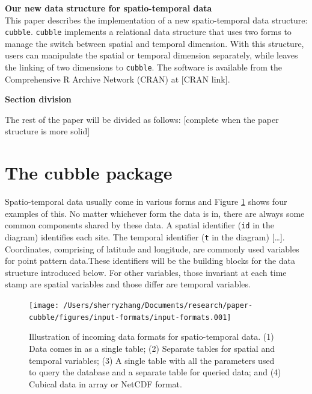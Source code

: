 \documentclass[
]{jss}
\begin{document}
\textbf{Our new data structure for spatio-temporal data}\\
This paper describes the implementation of a new spatio-temporal data
structure: \texttt{cubble}. \texttt{cubble} implements a relational data
structure that uses two forms to manage the switch between spatial and
temporal dimension. With this structure, users can manipulate the
spatial or temporal dimension separately, while leaves the linking of
two dimensions to \texttt{cubble}. The software is available from the
Comprehensive R Archive Network (CRAN) at {[}CRAN link{]}. \newline

\textbf{Section division}

The rest of the paper will be divided as follows: {[}complete when the
paper structure is more solid{]}

\newpage

\hypertarget{the-cubble-package}{%
\section{The cubble package}\label{the-cubble-package}}

Spatio-temporal data usually come in various forms and Figure
\ref{fig:cubble-diagram} shows four examples of this. No matter
whichever form the data is in, there are always some common components
shared by these data. A spatial identifier (\texttt{id} in the diagram)
identifies each site. The temporal identifier (\texttt{t} in the
diagram) {[}\ldots{]}. Coordinates, comprising of latitude and
longitude, are commonly used variables for point pattern data.These
identifiers will be the building blocks for the data structure
introduced below. For other variables, those invariant at each time
stamp are spatial variables and those differ are temporal variables.

\begin{CodeChunk}
\begin{figure}

{\centering \texttt{[image: /Users/sherryzhang/Documents/research/paper-cubble/figures/input-formats/input-formats.001]} 

}

\caption[Illustration of incoming data formats for spatio-temporal data]{Illustration of incoming data formats for spatio-temporal data. (1) Data comes in as a single table; (2) Separate tables for spatial and temporal variables; (3) A single table with all the parameters used to query the database and a separate table for queried data; and (4) Cubical data in array or NetCDF format.}\label{fig:cubble-diagram}
\end{figure}
\end{CodeChunk}
\end{document}
